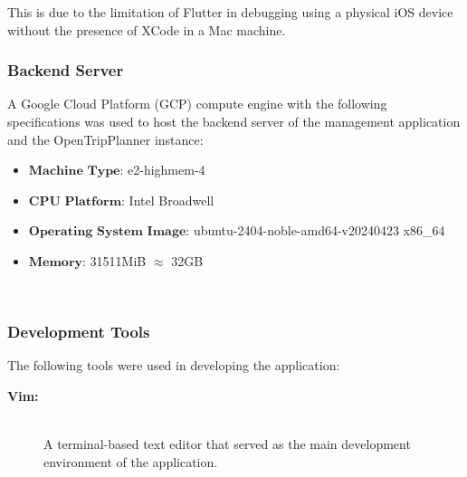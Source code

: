 \documentclass{icsthesis}
\begin{document}
\begin{mainmatter}
\begin{description}
		
		
		
		\end{description}
		
		This is due to the limitation of Flutter in debugging using a physical iOS device without the presence of XCode in a Mac machine.
		
		\subsubsection{\textbf{Backend Server}}
		A Google Cloud Platform (GCP) compute engine with the following specifications was used to host the backend server of the management application and the OpenTripPlanner instance:
		\begin{itemize}
			\item $\textbf{Machine Type:}$  e2-highmem-4
			\item $\textbf{CPU Platform:}$ Intel Broadwell
			\item $\textbf{Operating System Image:}$ ubuntu-2404-noble-amd64-v20240423 x86\_64
			\item $\textbf{Memory:}$ 31511MiB $\approx$ 32GB
		\end{itemize} \hfill \
		\hfill
		
		\subsubsection{\textbf{Development Tools}}
		The following tools were used in developing the application:
		
		\begin{description}
			\item[\textbf{Vim:}] \hfill \\
				A terminal-based text editor that served as the main development environment of the application.
		

\end{description}
\end{mainmatter}
\end{document}
